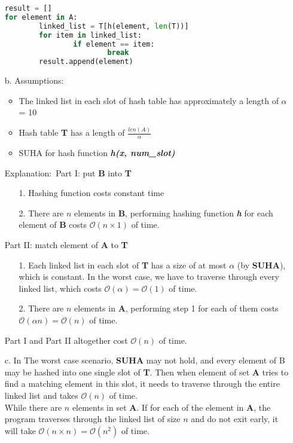 \documentclass[10pt]{article}
\begin{document}
\begin{enumerate}
\begin{lstlisting}[language=Python]
result = []
for element in A:
		linked_list = T[h(element, len(T))]
		for item in linked_list:
				if element == item:
						break
		result.append(element)
\end{lstlisting}
\item[b.]
Assumptions:\
\begin{itemize}
\item The linked list in each slot of hash table has approximately a length of $\alpha$ = 10
\item Hash table \textbf{T} has a length of $\frac{len(A)}{\alpha}$
\item SUHA for hash function \textbf{\textit{h(x, num\_slot)}}
\end{itemize}
Explanation:\
Part I: put \textbf{B} into \textbf{T}
\begin{enumerate}
\item[1.] Hashing function costs constant time
\item[2.] There are $n$ elements in \textbf{B}, performing hashing function \textbf{\textit{h}} for each element of \textbf{B} costs $\mathcal{O}(n\times1)$ of time.
\end{enumerate}
Part II: match element of \textbf{A} to \textbf{T}
\begin{enumerate}
\item[1.] Each linked list in each slot of \textbf{T} has a size of at most $\alpha$ (by \textbf{SUHA}), which is constant. In the worst case, we have to traverse through every linked list, which costs $\mathcal{O}(\alpha)=\mathcal{O}(1)$ of time.
\item[2.] There are $n$ elements in \textbf{A}, performing step 1 for each of them costs $\mathcal{O}(\alpha n)=\mathcal{O}(n)$ of time.
\end{enumerate}
Part I and Part II altogether cost $\mathcal{O}(n)$ of time.
\item[c.] In The worst case scenario, \textbf{SUHA} may not hold, and every element of B may be hashed into one single slot of \textbf{T}. Then when element of set \textbf{A} tries to find a matching element in this slot, it needs to traverse through the entire linked list and takes $\mathcal{O}(n)$ of time.\\
While there are $n$ elements in set \textbf{A}. If for each of the element in \textbf{A}, the program traverses through the linked list of size $n$ and do not exit early, it will take $\mathcal{O}(n\times n) = \mathcal{O}(n^2)$ of time.
\end{enumerate}
\end{document}
